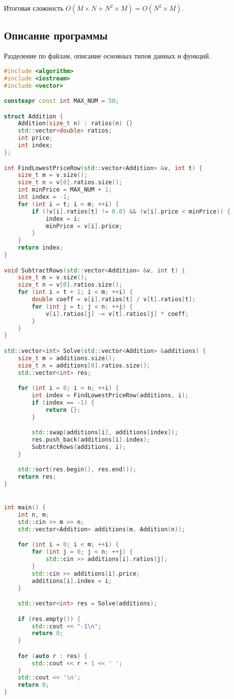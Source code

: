\documentclass[12pt]{article}
\begin{document}
Итоговая сложность $O(M \times N + N^2 \times M) = O(N^2 \times M).$

\subsection*{Описание программы}

Разделение по файлам, описание основных типов данных и функций. \\

\begin{lstlisting}[language=C++]
#include <algorithm>
#include <iostream>
#include <vector>

constexpr const int MAX_NUM = 50;

struct Addition {
    Addition(size_t n) : ratios(n) {}
    std::vector<double> ratios;
    int price;
    int index;
};

int FindLowestPriceRow(std::vector<Addition> &v, int t) {
    size_t m = v.size();
    size_t n = v[0].ratios.size();
    int minPrice = MAX_NUM + 1;
    int index = -1;
    for (int i = t; i < m; ++i) {
        if ((v[i].ratios[t] != 0.0) && (v[i].price < minPrice)) {
            index = i;
            minPrice = v[i].price;
        }
    }
    return index;
}

void SubtractRows(std::vector<Addition> &v, int t) {
    size_t m = v.size();
    size_t n = v[0].ratios.size();
    for (int i = t + 1; i < m; ++i) {
        double coeff = v[i].ratios[t] / v[t].ratios[t];
        for (int j = t; j < n; ++j) {
            v[i].ratios[j] -= v[t].ratios[j] * coeff;
        }
    }
}

std::vector<int> Solve(std::vector<Addition> &additions) {
    size_t m = additions.size();
    size_t n = additions[0].ratios.size();
    std::vector<int> res;

    for (int i = 0; i < n; ++i) {
        int index = FindLowestPriceRow(additions, i);
        if (index == -1) {
            return {};
        }

        std::swap(additions[i], additions[index]);
        res.push_back(additions[i].index);
        SubtractRows(additions, i);
    }

    std::sort(res.begin(), res.end());
    return res;
}


int main() {
    int n, m;
    std::cin >> m >> n;
    std::vector<Addition> additions(m, Addition(n));

    for (int i = 0; i < m; ++i) {
        for (int j = 0; j < n; ++j) {
            std::cin >> additions[i].ratios[j];
        }
        std::cin >> additions[i].price;
        additions[i].index = i;
    }

    std::vector<int> res = Solve(additions);

    if (res.empty()) {
        std::cout << "-1\n";
        return 0;
    }

    for (auto r : res) {
        std::cout << r + 1 << ' ';
    }
    std::cout << '\n';
    return 0;
}
\end{lstlisting}
\end{document}
